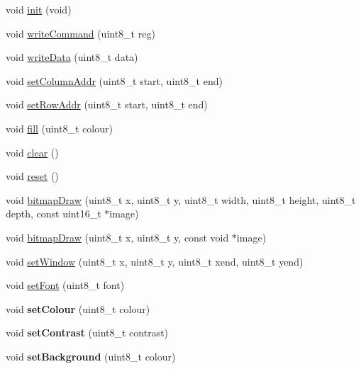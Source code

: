 \begin{DoxyCompactItemize}
\item 
void \hyperlink{class_oled_m_p_a2858154e2009b0e6e616f313177762bc}{init} (void)
\item 
void \hyperlink{class_oled_m_p_a8e6db26d87dd03220df176e0fca84274}{write\-Command} (uint8\-\_\-t reg)
\item 
void \hyperlink{class_oled_m_p_a0b7f79fe8ba1e0df0ea9a0b86d22a7f5}{write\-Data} (uint8\-\_\-t data)
\item 
void \hyperlink{class_oled_m_p_ab6d02b5a344d527b11e20482d66d017b}{set\-Column\-Addr} (uint8\-\_\-t start, uint8\-\_\-t end)
\item 
void \hyperlink{class_oled_m_p_af5896d9b31d48b65060f3e8d14fbd9bb}{set\-Row\-Addr} (uint8\-\_\-t start, uint8\-\_\-t end)
\item 
void \hyperlink{class_oled_m_p_a87cf6ceb4f1f60b6d8dfdcffdc17b693}{fill} (uint8\-\_\-t colour)
\item 
void \hyperlink{class_oled_m_p_ac8bb3912a3ce86b15842e79d0b421204}{clear} ()
\item 
void \hyperlink{class_oled_m_p_ad20897c5c8bd47f5d4005989bead0e55}{reset} ()
\item 
void \hyperlink{class_oled_m_p_af09ad4556321caf31c307537d66af1ac}{bitmap\-Draw} (uint8\-\_\-t x, uint8\-\_\-t y, uint8\-\_\-t width, uint8\-\_\-t height, uint8\-\_\-t depth, const uint16\-\_\-t $\ast$image)
\item 
void \hyperlink{class_oled_m_p_a510b35a68e77ab1177e5628b007ae6d0}{bitmap\-Draw} (uint8\-\_\-t x, uint8\-\_\-t y, const void $\ast$image)
\item 
void \hyperlink{class_oled_m_p_aec49e8d614e1d8f4013da1910061ee93}{set\-Window} (uint8\-\_\-t x, uint8\-\_\-t y, uint8\-\_\-t xend, uint8\-\_\-t yend)
\item 
void \hyperlink{class_oled_m_p_a9aaa84e447229c6e59b5fd4ceadba69c}{set\-Font} (uint8\-\_\-t font)
\item 
\hypertarget{class_oled_m_p_a82185ccc3af2d3c88f15d3755e067e28}{void {\bfseries set\-Colour} (uint8\-\_\-t colour)}\label{class_oled_m_p_a82185ccc3af2d3c88f15d3755e067e28}

\item 
\hypertarget{class_oled_m_p_a9a0717cf854563eb4eac46e98069b19e}{void {\bfseries set\-Contrast} (uint8\-\_\-t contrast)}\label{class_oled_m_p_a9a0717cf854563eb4eac46e98069b19e}

\item 
\hypertarget{class_oled_m_p_ad15386fa077d57da7709ea0f9a47035e}{void {\bfseries set\-Background} (uint8\-\_\-t colour)}\label{class_oled_m_p_ad15386fa077d57da7709ea0f9a47035e}


\end{DoxyCompactItemize}
